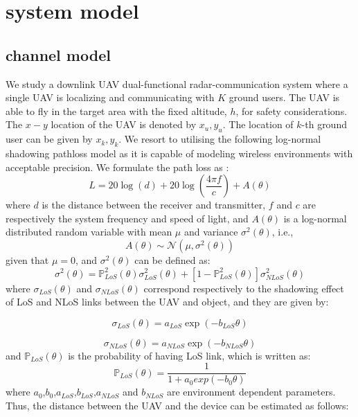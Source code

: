 \documentclass[journal,twocolumn]{IEEEtran}
\begin{document}
\section{system model} \label{sec_system}
\subsection{channel model}
We study a downlink UAV dual-functional radar-communication system where a single UAV is localizing and communicating with $K$  ground users. The UAV is able to fly in the target area with the fixed altitude, $h$, for safety considerations. The $x-y$ location of the UAV is denoted by $x_u,y_u$. The location of $k$-th ground user can be given by $x_{k},y_{k}$. 
We resort to utilising the following log-normal shadowing pathloss model as it is capable of modeling wireless environments with acceptable precision. We formulate the path loss as \cite{al2014optimal}: 
\begin{equation}\label{path_loss_1}
L = 20\log(d) + 20\log(\frac{4{\pi}f}{c}) + A(\theta)
\end{equation}
where $d$ is the distance between the receiver and transmitter, $f$ and $c$ are respectively the system frequency and speed of light, and $A(\theta)$ is a log-normal distributed random variable with mean $\mu$ and variance $\sigma^{2}(\theta)$, i.e.,
\begin{equation}
A(\theta) \sim \mathcal N(\mu,\sigma^2(\theta))
\end{equation}
given that $\mu = 0$, and $\sigma^{2}(\theta)$ can be defined as:
\begin{equation}
\sigma^{2}(\theta) = \mathbb{P}_{LoS}^2 (\theta) {\sigma^{2}_{LoS}(\theta)} +  [1-\mathbb{P}_{LoS}^2 (\theta)] {\sigma^{2}_{NLoS}(\theta)}
\end{equation}
where $\sigma_{LoS}(\theta)$ and $\sigma_{NLoS}(\theta)$ correspond respectively to the shadowing effect of LoS and NLoS links between the UAV and object, and they are given by:

\begin{equation}
\sigma_{LoS}(\theta) = a_{LoS}\exp(-b_{LoS}\theta)
\end{equation}

\begin{equation}
\sigma_{NLoS}(\theta) = a_{NLoS}\exp(-b_{NLoS}\theta)
\end{equation}
and $\mathbb{P}_{LoS}(\theta)$ is the probability of having LoS link, which is written as:
\begin{equation}
\mathbb{P}_{LoS}(\theta) = \frac{1}{1+a_0exp(-b_{0}\theta)}
\end{equation}
where $a_0$,$b_0$,$a_{LoS}$,$b_{LoS}$,$a_{NLoS}$ and $b_{NLoS}$ are environment dependent parameters. Thus, the distance between the UAV and the device can be estimated as follows:
\end{document}
